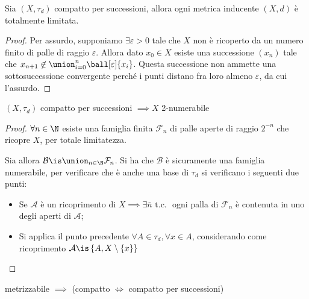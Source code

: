 \begin{prop}
	Sia $(X,\tau _d)$ compatto per successioni, allora ogni metrica inducente $(X,d)$ è totalmente limitata.
\end{prop}

\begin{proof}
	Per assurdo, supponiamo $\exists \varepsilon > 0$ tale che $X$ non è ricoperto da un numero finito di palle di raggio $\varepsilon$.
	Allora dato $x_0 \in X$ esiste una successione $(x_n)$ tale che
	$x_{n+1}\not\in\union_{i=0}^n\ball[\varepsilon]{x_i}$.
	Questa successione non ammette una sottosuccessione convergente perché i punti distano fra loro almeno $\varepsilon$, da cui l'assurdo.
\end{proof}

\begin{prop}
	$(X, \tau _d)$ compatto per successioni $\implies X$ 2-numerabile
\end{prop}

\begin{proof}
	$\forall n \in \N$ esiste una famiglia finita $\mathcal{F}_n$ di palle aperte di raggio $2^{-n}$ che ricopre $X$, per totale limitatezza.
	
	Sia allora $\mathcal{B} \is \union _{n \in \N} \mathcal F_n$. Si ha che $\mathcal{B}$ è sicuramente una famiglia numerabile, per verificare che è anche una base di $\tau _d$ si verificano i seguenti due punti:
	\begin{itemize}
		\item Se $\mathcal{A}$ è un ricoprimento di $X \implies \exists \bar{n} \text{ t.c. }$ ogni palla di $\mathcal{F}_n$ è contenuta in uno degli aperti di $\mathcal{A}$;
		\item Si applica il punto precedente $\forall A \in \tau _d , \forall x \in A$, considerando come ricoprimento $\mathcal{A} \is \left\{ {A, X\setminus \left\{ {x}\right\}}\right\}$
	\end{itemize}
\end{proof}

\begin{cor}
	metrizzabile $\implies$ (compatto $\iff$ compatto per successioni)
\end{cor}

